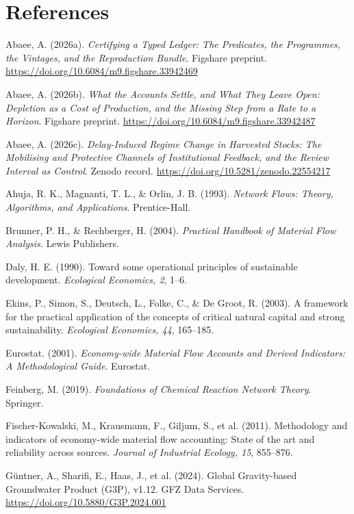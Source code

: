 \documentclass[11pt]{article}
\begin{document}
\section*{References}
\begin{list}{}{%
\setlength{\leftmargin}{1.5em}%
\setlength{\itemindent}{-1.5em}%
\setlength{\itemsep}{4pt}%
\setlength{\parsep}{0pt}%
\setlength{\topsep}{0pt}}
\item Abaee, A. (2026a). \emph{Certifying a Typed Ledger: The Predicates, the Programmes, the Vintages, and the Reproduction Bundle}. Figshare preprint. \url{https://doi.org/10.6084/m9.figshare.33942469}
\item Abaee, A. (2026b). \emph{What the Accounts Settle, and What They Leave Open: Depletion as a Cost of Production, and the Missing Step from a Rate to a Horizon}. Figshare preprint. \url{https://doi.org/10.6084/m9.figshare.33942487}
\item Abaee, A. (2026c). \emph{Delay-Induced Regime Change in Harvested Stocks: The Mobilising and Protective Channels of Institutional Feedback, and the Review Interval as Control}. Zenodo record. \url{https://doi.org/10.5281/zenodo.22554217}
\item Ahuja, R. K., Magnanti, T. L., \& Orlin, J. B. (1993). \emph{Network Flows: Theory, Algorithms, and Applications}. Prentice-Hall.
\item Brunner, P. H., \& Rechberger, H. (2004). \emph{Practical Handbook of Material Flow Analysis}. Lewis Publishers.
\item Daly, H. E. (1990). Toward some operational principles of sustainable development. \emph{Ecological Economics, 2}, 1--6.
\item Ekins, P., Simon, S., Deutsch, L., Folke, C., \& De Groot, R. (2003). A framework for the practical application of the concepts of critical natural capital and strong sustainability. \emph{Ecological Economics, 44}, 165--185.
\item Eurostat. (2001). \emph{Economy-wide Material Flow Accounts and Derived Indicators: A Methodological Guide}. Eurostat.
\item Feinberg, M. (2019). \emph{Foundations of Chemical Reaction Network Theory}. Springer.
\item Fischer-Kowalski, M., Krausmann, F., Giljum, S., et al. (2011). Methodology and indicators of economy-wide material flow accounting: State of the art and reliability across sources. \emph{Journal of Industrial Ecology, 15}, 855--876.
\item G{\"u}ntner, A., Sharifi, E., Haas, J., et al. (2024). Global Gravity-based Groundwater Product (G3P), v1.12. GFZ Data Services. \url{https://doi.org/10.5880/G3P.2024.001}

\end{list}
\end{document}
